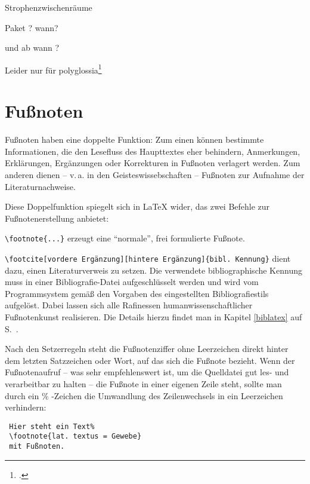 Strophenzwischenräume

Paket ? wann?

und ab wann ?



Leider nur für polyglossia\footcite[33\psqq]{rouquette:2012}


\section{Fußnoten}

Fußnoten haben eine doppelte Funktion: 
Zum einen können bestimmte Informationen, die den Lesefluss des Haupttextes eher behindern,
Anmerkungen, Erklärungen, Ergänzungen oder Korrekturen in Fußnoten verlagert werden.
Zum anderen dienen -- v.\,a. in den Geisteswissebschaften -- Fußnoten zur Aufnahme der 
Literaturnachweise.

Diese Doppelfunktion spiegelt sich in \LaTeX{} wider, das zwei Befehle zur Fußnotenerstellung
anbietet:

\lstinline/\footnote{...}/ erzeugt eine \enquote{normale}, frei formulierte Fußnote.

\lstinline/\footcite[vordere Ergänzung][hintere Ergänzung]{bibl. Kennung}/ dient dazu,
einen Literaturverweis zu setzen. Die verwendete bibliographische Kennung muss in einer
Bibliografie-Datei aufgeschlüsselt werden und wird vom Programmsystem gemäß den Vorgaben
des eingestellten Bibliografiestils aufgelöst. Dabei lassen sich alle Rafinessen 
humanwissenschaftlicher Fußnotenkunst realisieren. 
Die Details hierzu findet man in Kapitel \ref{biblatex} auf S.~\pageref{biblatex}. 

Nach den Setzerregeln steht die Fußnotenziffer ohne Leerzeichen direkt hinter dem letzten
Satzzeichen oder Wort, auf das sich die Fußnote bezieht.
Wenn der Fußnotenaufruf -- was sehr empfehlenswert ist, um die Quelldatei gut les- und 
verarbeitbar zu halten -- die Fußnote in einer eigenen Zeile steht, sollte man durch ein 
\% -Zeichen die Umwandlung des Zeilenwechsels in ein Leerzeichen verhindern:

\begin{lstlisting}
 Hier steht ein Text%
 \footnote{lat. textus = Gewebe}
 mit Fußnoten.
\end{lstlisting}



